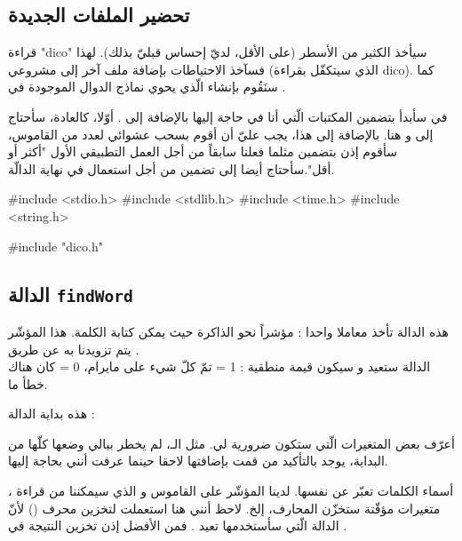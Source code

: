 \subsection{تحضير الملفات الجديدة}

قراءة
"\textenglish{dico}"
سيأخذ الكثير من الأسطر (على الأقل، لديّ إحساس قبليّ بذلك). لهذا فسآخذ الاحتياطات بإضافة ملف آخر إلى مشروعي
(الذي سيتكفّل بقراءة
\textenglish{dico}).
كما سنَقُوم بإنشاء
الّذي يحوي نماذج الدوال الموجودة في
.

في
سأبدأ بتضمين  المكتبات الّتي أنا في حاجة إليها بالإضافة إلى
.
أوّلا، كالعادة، سأحتاج إلى
و
هنا. بالإضافة إلى هذا، يجب عليّ أن أقوم بسحب عشوائي لعدد من القاموس، سأقوم إذن بتضمين
مثلما فعلنا سابقاً من أجل العمل التطبيقي الأول "أكثر أو أقل".سأحتاج أيضا إلى تضمين
من أجل استعمال
في نهاية الدالّة.

\begin{Csource}
#include <stdio.h>
#include <stdlib.h>
#include <time.h>
#include <string.h>

#include "dico.h"
\end{Csource}

\subsection{الدالة
\texttt{findWord}}
هذه الدالة تأخذ معاملا واحدا : مؤشراً نحو الذاكرة حيث يمكن كتابة الكلمة. هذا المؤشّر يتم تزويدنا به عن طريق
.\\
الدالة ستعيد
و سيكون قيمة منطقية : 1 = تمّ كلّ شيء على مايرام، 0 = كان هناك خطأ ما.

هذه بداية الدالة :

\begin{Csource}
int findWord(char *chosenWord)
{
  FILE* dico = NULL; // The pointer of the file
  int wordsNumber = 0, chosenWordNumber = 0, i = 0;
  int readCharacter = 0;
\end{Csource}

أعرّف بعض المتغيرات الّتي ستكون ضرورية لي. مثل الـ،
لم يخطر ببالي وضعها كلّها من البداية، يوجد بالتأكيد من قمت بإضافتها لاحقا حينما عرفت أنني بحاجة إليها.

أسماء الكلمات تعبّر عن نفسها. لدينا المؤشّر على القاموس
و الذي سيمكننا من قراءة
،
متغيرات مؤقّتة ستخزّن المحارف، إلخ.
لاحظ أنني هنا استعملت
لتخزين محرف
()
لأنّ الدالة
الّتي سأستخدمها تعيد
.
فمن الأفضل إذن تخزين النتيجة في
.

